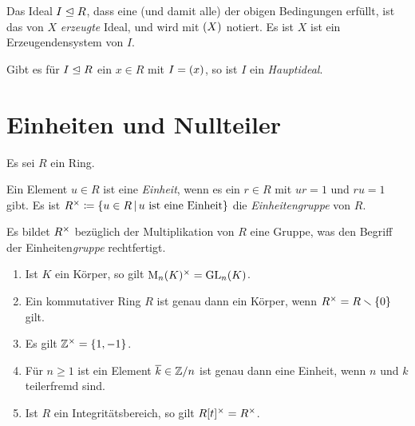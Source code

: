 \begin{definition}
  Das Ideal $I \mathrel{\trianglelefteq} R$, dass eine \textup(und damit alle\textup) der obigen Bedingungen erfüllt, ist das von $X$ \emph{erzeugte} Ideal, und wird mit $(X)$ notiert.
  Es ist $X$ ist ein Erzeugendensystem von $I$.
\end{definition}

\begin{definition}
  Gibt es für $I \mathrel{\trianglelefteq} R$ ein $x \in R$ mit $I = (x)$, so ist $I$ ein \emph{Hauptideal}.
\end{definition}





\section{Einheiten und Nullteiler}

Es sei $R$ ein Ring.

\begin{definition}
  Ein Element $u \in R$ ist eine \emph{Einheit}, wenn es ein $r \in R$ mit $ur = 1$ und $ru = 1$ gibt.
  Es ist
  $
              \unitgroup{R}
    \defined  \{
                u \in R
              \suchthat 
                \text{$u$ ist eine Einheit}
              \}
  $
  die \emph{Einheitengruppe} von $R$.
\end{definition}

Es bildet $R^{\times}$ bezüglich der Multiplikation von $R$ eine Gruppe, was den Begriff der Einheiten\emph{gruppe} rechtfertigt.

\begin{example}
  \begin{enumerate}
    \item
      Ist $K$ ein Körper, so gilt $\operatorname{M}_{n}(K)^{\times} = \operatorname{GL}_{n}(K)$.
    \item
      Ein kommutativer Ring $R$ ist genau dann ein Körper, wenn $R^{\times} = R \smallsetminus \{0\}$ gilt.
    \item
      Es gilt $\mathbb{Z}^{\times} = \{1, -1\}$.
    \item
      Für $n \geq 1$ ist ein Element $\overline{k} \in \mathbb{Z}/n$ ist genau dann eine Einheit, wenn $n$ und $k$ teilerfremd sind.
    \item
      Ist $R$ ein Integritätsbereich, so gilt $R[t]^{\times} = R^{\times}$.
  \end{enumerate}
\end{example}

